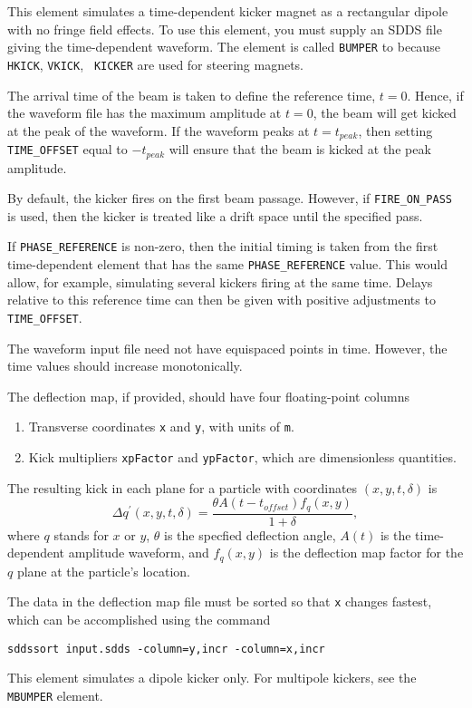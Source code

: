 This element simulates a time-dependent kicker magnet as a rectangular
dipole with no fringe field effects.  To use this element, you must
supply an SDDS file giving the time-dependent waveform.  The element
is called {\tt BUMPER} to because {\tt HKICK}, {\tt VKICK}, {\tt
KICKER} are used for steering magnets.

The arrival time of the beam is taken to define the reference time,
$t=0$.  Hence, if the waveform file has the maximum amplitude at
$t=0$, the beam will get kicked at the peak of the waveform.  If the waveform
peaks at $t=t_{peak}$, then setting \verb|TIME_OFFSET| equal to $-t_{peak}$
will ensure that the beam is kicked at the peak amplitude.

By default, the kicker fires on the first beam passage.  However, if 
\verb|FIRE_ON_PASS| is used, then the kicker is treated like a drift space until
the specified pass.

If \verb|PHASE_REFERENCE| is non-zero, then the initial timing is
taken from the first time-dependent element that has the same
\verb|PHASE_REFERENCE| value.  This would allow, for example,
simulating several kickers firing at the same time.  Delays relative
to this reference time can then be given with positive adjustments to
\verb|TIME_OFFSET|.

The waveform input file need not have equispaced points in time.  However, the
time values should increase monotonically.

The deflection map, if provided, should have four floating-point columns
\begin{enumerate}
\item Transverse coordinates \verb|x| and \verb|y|, with units of \verb|m|.
\item Kick multipliers \verb|xpFactor| and \verb|ypFactor|, which are dimensionless quantities.
\end{enumerate}
The resulting kick in each plane for a particle with coordinates $(x, y, t, \delta)$ is 
\begin{equation}
\Delta q^\prime (x, y, t, \delta) = \frac{\theta A(t-t_{offset}) f_q(x, y)}{1 + \delta},
\end{equation}
where $q$ stands for $x$ or $y$, $\theta$ is the specfied deflection angle, 
$A(t)$ is the time-dependent amplitude waveform, and $f_q(x, y)$ is the
deflection map factor for the $q$ plane at the particle's location.

The data in the deflection map file must be sorted so that \verb|x| changes fastest, which can be accomplished using
the command
\begin{verbatim}
sddssort input.sdds -column=y,incr -column=x,incr 
\end{verbatim}

This element simulates a dipole kicker only.  For multipole kickers, see the
{\tt MBUMPER} element.